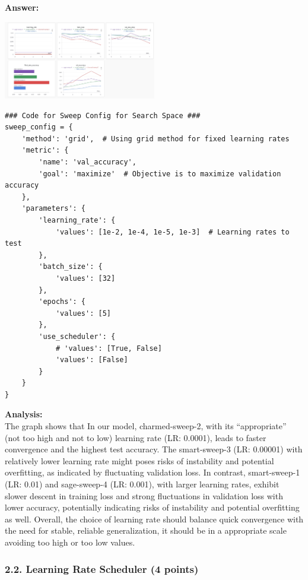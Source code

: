 \documentclass[11pt, oneside]{article}   	%
\begin{document}
\textbf{Answer:} \\
\begin{center}
    \includegraphics[width=0.5\textwidth]{report_pic/SweepChart1.png}
\end{center}

\begin{verbatim}
### Code for Sweep Config for Search Space ###
sweep_config = {
    'method': 'grid',  # Using grid method for fixed learning rates
    'metric': {
        'name': 'val_accuracy',
        'goal': 'maximize'  # Objective is to maximize validation accuracy
    },
    'parameters': {
        'learning_rate': {
            'values': [1e-2, 1e-4, 1e-5, 1e-3]  # Learning rates to test
        },
        'batch_size': {
            'values': [32]
        },
        'epochs': {
            'values': [5]
        },
        'use_scheduler': {
            # 'values': [True, False]
            'values': [False]
        }
    }
}
\end{verbatim}

\textbf{Analysis: }
\\
The graph shows that In our model, charmed-sweep-2, with its ``appropriate'' (not too high and not to low) learning rate (LR: 0.0001), leads to faster convergence and the highest test accuracy. The smart-sweep-3 (LR: 0.00001) with relatively lower learning rate might poses risks of instability and potential overfitting, as indicated by fluctuating validation loss. In contrast, smart-sweep-1 (LR: 0.01) and sage-sweep-4 (LR: 0.001), with larger learning rates, exhibit slower descent in training loss and strong fluctuations in validation loss with lower accuracy, potentially indicating risks of instability and potential overfitting as well. Overall, the choice of learning rate should balance quick convergence with the need for stable, reliable generalization, it should be in a appropriate scale avoiding too high or too low values. 

\subsubsection*{2.2. Learning Rate Scheduler (4 points)}
\end{document}
